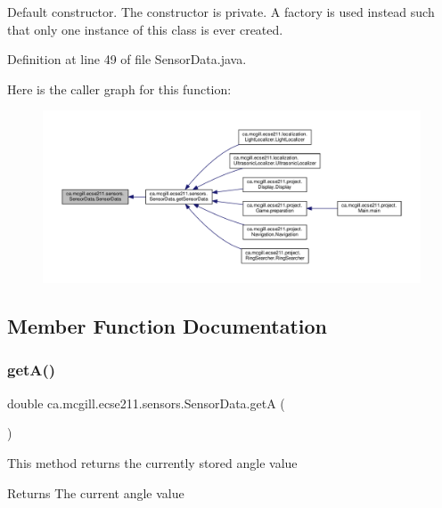 Default constructor. The constructor is private. A factory is used instead such that only one instance of this class is ever created. 

Definition at line 49 of file Sensor\+Data.\+java.

Here is the caller graph for this function\+:
\nopagebreak
\begin{figure}[H]
\begin{center}
\leavevmode
\includegraphics[width=350pt]{classca_1_1mcgill_1_1ecse211_1_1sensors_1_1_sensor_data_a41b9929f62455a15364385a339b4b910_icgraph}
\end{center}
\end{figure}


\subsection{Member Function Documentation}
\mbox{\label{classca_1_1mcgill_1_1ecse211_1_1sensors_1_1_sensor_data_a7ad543db5c907b4bd3329dbb34b4e9d9}} 
\subsubsection{\texorpdfstring{get\+A()}{getA()}}
{\footnotesize\ttfamily double ca.\+mcgill.\+ecse211.\+sensors.\+Sensor\+Data.\+getA (\begin{DoxyParamCaption}{ }\end{DoxyParamCaption})}

This method returns the currently stored angle value

\begin{DoxyReturn}{Returns}
The current angle value 
\end{DoxyReturn}


